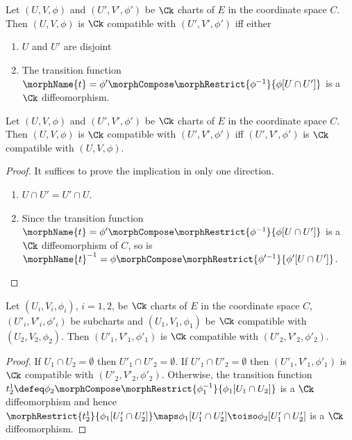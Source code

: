 \documentclass{article}
\begin{document}
\begin{definition}
\label{Ck-compat}
Let $(U, V, \phi)$ and $(U',V', \phi')$ be $\Ck$ charts of $E$ in the
coordinate space $C$. Then $(U, V, \phi)$ is $\Ck$ compatible with
$(U', V', \phi')$ iff either
\begin{enumerate}
\item $U$ and $U'$ are disjoint
\item The transition function $\morphName{t}=\phi' \morphCompose \morphRestrict{\phi^{-1}}{\phi[U \cap U']}$
is a $\Ck$ diffeomorphism.
\end{enumerate}
\end{definition}

\begin{lemma}
\label{lem:Ck-compatsym}
Let $(U, V, \phi)$ and $(U',V', \phi')$ be $\Ck$ charts of $E$ in the
coordinate space $C$.
Then $(U, V, \phi)$ is $\Ck$ compatible with $(U', V', \phi')$ iff
$(U', V', \phi')$ is $\Ck$ compatible with $(U,V,\phi)$.

\begin{proof}
It suffices to prove the implication in only one direction.
\begin{enumerate}
\item $U \cap U' = U' \cap U$.
\item Since the transition function
$\morphName{t}=\phi' \morphCompose \morphRestrict{\phi^{-1}}{\phi[U \cap U']}$
is a  $\Ck$ diffeomorphism of $C$, so is
$\morphName{t}^{-1} = \phi \morphCompose \morphRestrict{\phi'^{-1}}{\phi'[U \cap U']}$.
\end{enumerate}
\end{proof}
\end{lemma}

\begin{lemma}
Let $(U_i, V_i, \phi_i)$, $i=1,2$, be $\Ck$ charts of $E$ in the
coordinate space $C$, $(U'_i, V'_i, \phi'_i)$ be subcharts and
$(U_1, V_1, \phi_1)$ be $\Ck$ compatible with $(U_2, V_2, \phi_2)$. Then
$(U'_1, V'_1, \phi'_1)$ is $\Ck$ compatible with
$(U'_2, V'_2, \phi'_2)$.

\begin{proof}
If $U_1 \cap U_2 = \emptyset$ then $U'_1 \cap U'_2 = \emptyset$. If
$U'_1 \cap U'_2 = \emptyset$ then $(U'_1, V'_1, \phi'_1)$ is $\Ck$
compatible with $(U'_2, V'_2, \phi'_2)$. Otherwise, the transition
function
$
  t^1_2 \defeq
  \phi_2 \morphCompose \morphRestrict{\phi^{-1}_1}{\phi_1[U_1 \cap U_2]}
$
is a $\Ck$ diffeomorphism and hence
$
  \morphRestrict{t^1_2}{\phi_1[U'_1 \cap U'_2]} \maps
  \phi_1[U'_1 \cap U'_2] \toiso
  \phi_2[U'_1 \cap U'_2]
$
is a $\Ck$ diffeomorphism.
\end{proof}
\end{lemma}
\end{document}
